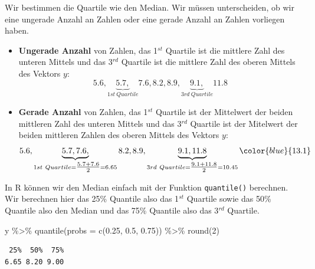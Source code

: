 \documentclass[
  letterpaper,
  DIV=11,
  oneside]{scrreport}
\newenvironment{Shaded}{\begin{snugshade}}{\end{snugshade}}
\newcommand{\AttributeTok}[1]{\textcolor[rgb]{0.40,0.45,0.13}{#1}}
\newcommand{\DecValTok}[1]{\textcolor[rgb]{0.68,0.00,0.00}{#1}}
\newcommand{\FloatTok}[1]{\textcolor[rgb]{0.68,0.00,0.00}{#1}}
\newcommand{\FunctionTok}[1]{\textcolor[rgb]{0.28,0.35,0.67}{#1}}
\newcommand{\NormalTok}[1]{\textcolor[rgb]{0.00,0.23,0.31}{#1}}
\newcommand{\SpecialCharTok}[1]{\textcolor[rgb]{0.37,0.37,0.37}{#1}}
\begin{document}
Wir bestimmen die Quartile wie den Median. Wir müssen unterscheiden, ob
wir eine ungerade Anzahl an Zahlen oder eine gerade Anzahl an Zahlen
vorliegen haben.

\begin{itemize}
\item
  \textbf{Ungerade Anzahl} von Zahlen, das 1\(^{st}\) Quartile ist die
  mittlere Zahl des unteren Mittels und das 3\(^{rd}\) Quartile ist die
  mittlere Zahl des oberen Mittels des Vektors \(y\): \[
  5.6,  \underbrace{5.7,}_{1st\ Quartile}  7.6,  8.2,  8.9,  \underbrace{9.1,}_{3rd\ Quartile} 11.8
  \]
\item
  \textbf{Gerade Anzahl} von Zahlen, das 1\(^{st}\) Quartile ist der
  Mittelwert der beiden mittleren Zahl des unteren Mittels und das
  3\(^{rd}\) Quartile ist der Mitelwert der beiden mittleren Zahlen des
  oberen Mittels des Vektors \(y\): \[
  5.6,  \underbrace{5.7, 7.6,}_{1st\ Quartile = \tfrac{5.7+7.6}{2}=6.65}    8.2,  8.9,  \underbrace{9.1, 11.8}_{3rd\ Quartile = \tfrac{9.1+11.8}{2}=10.45} \color{blue}{13.1}
  \]
\end{itemize}

{}

In R können wir den Median einfach mit der Funktion \texttt{quantile()}
berechnen. Wir berechnen hier das 25\% Quantile also das 1\(^{st}\)
Quartile sowie das 50\% Quantile also den Median und das 75\% Quantile
also das 3\(^{rd}\) Quartile.

\begin{Shaded}
\begin{Highlighting}[]
\NormalTok{y }\SpecialCharTok{\%\textgreater{}\%} \FunctionTok{quantile}\NormalTok{(}\AttributeTok{probs =} \FunctionTok{c}\NormalTok{(}\FloatTok{0.25}\NormalTok{, }\FloatTok{0.5}\NormalTok{, }\FloatTok{0.75}\NormalTok{)) }\SpecialCharTok{\%\textgreater{}\%} \FunctionTok{round}\NormalTok{(}\DecValTok{2}\NormalTok{)}
\end{Highlighting}
\end{Shaded}

\begin{verbatim}
 25%  50%  75% 
6.65 8.20 9.00 
\end{verbatim}
\end{document}
